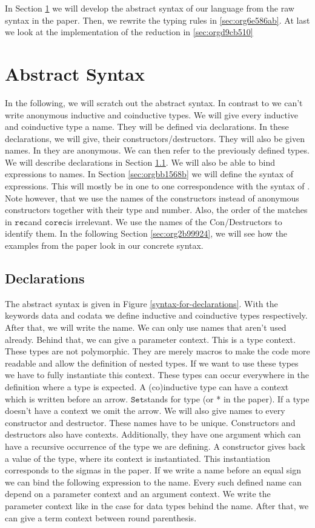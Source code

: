 \documentclass[a4paper,cleardoubleempty,BCOR1cm]{scrbook}
\begin{document}
In Section \ref{sec:orgae52194} we will develop the abstract syntax of our language
from the raw syntax in the paper. Then, we rewrite the typing rules in \ref{sec:org6e586ab}. At last we look at the implementation of the reduction in \ref{sec:orgd9cb510}
\section{Abstract Syntax}
\label{sec:orgae52194}
In the following, we will scratch out the abstract syntax. In contrast to
\cite{basold2016type} we can't write anonymous inductive and coinductive types.
We will give every inductive and coinductive type a name. They will be
defined via declarations. In these declarations, we will give, their
constructors/destructors. They will also be given names. In \cite{basold2016type}
they are anonymous. We can then refer to the previously defined types. We
will describe declarations in Section \ref{sec:orgd56d936}. We will also be able to
bind expressions to names. In Section \ref{sec:orgbb1568b} we will define the syntax
of expressions. This will mostly be in one to one correspondence with the
syntax of \cite{basold2016type}. Note however, that we use the names of the
constructors instead of anonymous constructors together with their type and
number. Also, the order of the matches in $\mathtt{rec}$\;and $\mathtt{corec}$\;is irrelevant. We use
the names of the Con/Destructors to identify them. In the following Section
\ref{sec:org2b99924}, we will see how the examples from the paper look in our concrete
syntax.
\subsection{Declarations}
\label{sec:orgd56d936}
The abstract syntax is given in Figure \ref{syntax-for-declarations}. With the
keywords data and codata we define inductive and coinductive types
respectively. After that, we will write the name. We can only use names that
aren't used already. Behind that, we can give a parameter context. This is a
type context. These types are not polymorphic. They are merely macros to make
the code more readable and allow the definition of nested types. If we want
to use these types we have to fully instantiate this context. These types can
occur everywhere in the definition where a type is expected. A (co)inductive
type can have a context which is written before an arrow. $\mathtt{Set}$\;stands for
type (or * in the paper). If a type doesn't have a context we omit the arrow.
We will also give names to every constructor and destructor. These names have
to be unique. Constructors and destructors also have contexts. Additionally,
they have one argument which can have a recursive occurrence of the type we
are defining. A constructor gives back a value of the type, where its
context is instantiated. This instantiation corresponds to the sigmas in the
paper. If we write a name before an equal sign we can bind the following
expression to the name. Every such defined name can depend on a parameter
context and an argument context. We write the parameter context like in the
case for data types behind the name. After that, we can give a term context
between round parenthesis.
\end{document}
